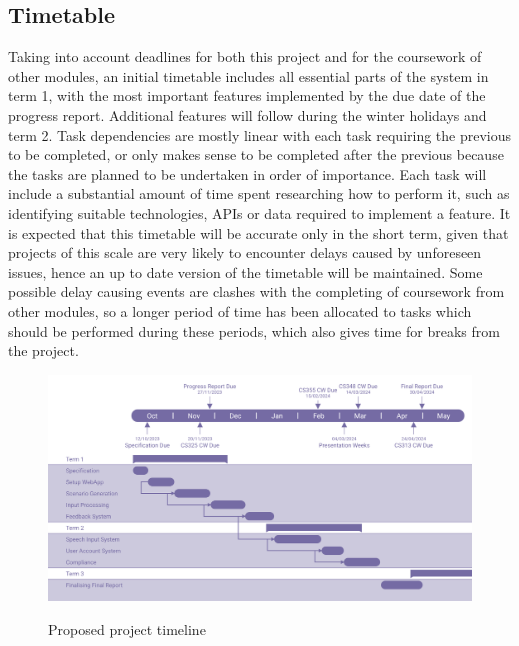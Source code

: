 \subsection{Timetable}
Taking into account deadlines for both this project and for the coursework of other modules, an initial timetable includes all essential parts of the system in term 1, with the most important features implemented by the due date of the progress report. Additional features will follow during the winter holidays and term 2. Task dependencies are mostly linear with each task requiring the previous to be completed, or only makes sense to be completed after the previous because the tasks are planned to be undertaken in order of importance. Each task will include a substantial amount of time spent researching how to perform it, such as identifying suitable technologies, APIs or data required to implement a feature. It is expected that this timetable will be accurate only in the short term, given that projects of this scale are very likely to encounter delays caused by unforeseen issues, hence an up to date version of the timetable will be maintained. Some possible delay causing events are clashes with the completing of coursework from other modules, so a longer period of time has been allocated to tasks which should be performed during these periods, which also gives time for breaks from the project.

\begin{figure}[H]
    \centering
	\includegraphics[scale = 0.42]{../document-resources/images/initial-gantt.png}
    \label{initialgantt}
    \caption{Proposed project timeline}
\end{figure}

